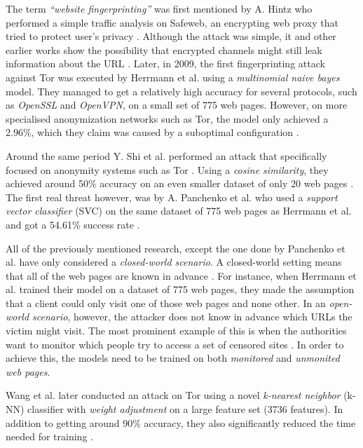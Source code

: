 The term \textit{``website fingerprinting''} was first mentioned by A. Hintz who performed a simple traffic analysis on Safeweb,
an encrypting web proxy that tried to protect user's privacy \cite{hintz2002fingerprinting}. Although the attack was simple, it and other earlier
works show the possibility that encrypted channels might still leak information about the URL \cite{hintz2002fingerprinting, wagner1996analysis}.
Later, in 2009, the first fingerprinting attack against Tor was executed by Herrmann et al. using a \textit{multinomial naive bayes} model.
They managed to get a relatively high accuracy for several protocols, such as \textit{OpenSSL} and \textit{OpenVPN}, on a small set of 775 web pages.
However, on more specialised anonymization networks such as Tor, the model only achieved a 2.96\%, which they claim was caused by a suboptimal configuration \cite{herrmann2009website}.

Around the same period Y. Shi et al. performed an attack that specifically focused on anonymity systems such as Tor \cite{shi2009fingerprinting}.
Using a \textit{cosine similarity}, they achieved around 50\% accuracy on an even smaller dataset of only 20 web pages \cite{shi2009fingerprinting}.
The first real threat however, was by A. Panchenko et al. who used a \textit{support vector classifier} (SVC) on the same dataset of 775 web pages as Herrmann et al.
and got a 54.61\% success rate \cite{herrmann2009website, panchenko1}.

All of the previously mentioned research, except the one done by Panchenko et al. have only considered a \textit{closed-world scenario}.
A closed-world setting means that all of the web pages are known in advance \cite{panchenko1}.
For instance, when Herrmann et al. trained their model on a dataset of 775 web pages, they made the assumption that a client could only visit one of
those web pages and none other.
In an \textit{open-world scenario}, however, the attacker does not know in advance which URLs the victim might visit.
The most prominent example of this is when the authorities want to monitor which people try to access a set of censored sites \cite{panchenko1}.
In order to achieve this, the models need to be trained on both \textit{monitored} and \textit{unmonited web pages}.

Wang et al. later conducted an attack on Tor using a novel \textit{k-nearest neighbor} (k-NN) classifier with \textit{weight adjustment} on a large feature set (3736 features).
In addition to getting around 90\% accuracy, they also significantly reduced the time needed for training \cite{wang_cai_johnson_nithyanand_goldberg_2014}.

